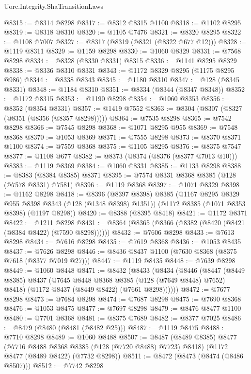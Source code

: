 \begin{lexlean}{Uorc.Integrity.ShaTransitionLaws}
\begin{coremodule}
@8315 := @8314 @8298
@8317 := @8312 @8315 @1100
@8318 := @1102 @8295
@8319 := @8318 @8310
@8320 := @1105 @7476
@8321 := @8320 @8295
@8322 := @1108 @7007
@8327 := @8317 (@8319 (@8321 (@8322 @677 @12)))
@8328 := @1119 @8311
@8329 := @1159 @8298
@8330 := @1060 @8329
@8331 := @7568 @8298
@8334 := @8328 (@8330 @8331) @8315
@8336 := @1141 @8295 @8329
@8338 := @8336 @8310 @8331
@8343 := @1172 @8329 @8295 (@1175 @8295 @986)
@8344 := @8338 @8343
@8345 := @1180 @8310
@8347 := @128 (@8345 @8331)
@8348 := @1184 @8310
@8351 := @8334 (@8344 (@8347 @8348))
@8352 := @1172 @8315
@8353 := @1190 @8298
@8354 := @1060 @8353
@8356 := @8352 (@8354 @8331)
@8357 := @1419 @7552
@8363 := @8304 (@8307 (@8327 (@8351 (@8356 (@8357 @8298)))))
@8364 := @7535 @8298
@8365 := @7542 @8298
@8366 := @7545 @8298
@8368 := @1071 @8295 @955
@8369 := @7548 @8368
@8370 := @1053 @8369
@8371 := @7555 @8298
@8373 := @8370 @8371 @1100
@8374 := @7559 @8368
@8375 := @1105 @8295
@8376 := @8375 @7547
@8377 := @1108 @677
@8382 := @8373 (@8374 (@8376 (@8377 @7013 @10)))
@8383 := @1119 @8369
@8384 := @1060 @8331
@8385 := @1133 @8298
@8388 := @8383 (@8384 @8385) @8371
@8395 := @7574 @8331 @8368 @8385 (@128 (@7578 @8331) @7581)
@8396 := @1119 @8368
@8397 := @1071 @8329
@8398 := @1162 @8298
@8418 := @8396
    (@8397 @8398)
    @8385
    (@1167 @8295 @8329 @955 @8398 @8343 (@128 (@1348 @8398) @1351))
    (@1172 @8385 (@1071 @8353 @8398) (@1197 @8298))
@8420 := @8388 (@8395 @8418)
@8421 := @1172 @8371
@8422 := @1211 @8298
@8431 := @8364 (@8365 (@8366 (@8382 (@8420 (@8421 (@8384 @8422) (@7590 @8298))))))
@8432 := @7606 @8298
@8433 := @7613 @8298
@8434 := @7616 @8298
@8435 := @7619 @8368
@8436 := @1053 @8435
@8437 := @7626 @8298
@8446 := @8436 @8437 @1100 (@7630 @8368 (@8375 @7618 (@8377 @7019 @27)))
@8447 := @1119 @8435
@8448 := @7639 @8298
@8449 := @1060 @8448
@8471 := @8432
    (@8433
      (@8434
        (@8446
          (@8447
            (@8449 @8385)
            @8437
            (@7645 @8448 @8368 @8385 (@128 (@7649 @8448) @7652) @8418)
            (@1172 @8437 (@8449 @8422) (@7661 @8298))))))
@8472 := @7677 @8298
@8473 := @7684 @8298
@8474 := @7687 @8298
@8475 := @7690 @8368
@8476 := @1053 @8475
@8477 := @7697 @8298
@8479 := @8476 @8477 @1100
@8480 := @7701 @8368
@8481 := @8375 @7689
@8482 := @8377 @7025
@8486 := @8479 (@8480 (@8481 (@8482 @25)))
@8487 := @1119 @8475
@8488 := @7710 @8298
@8489 := @1060 @8488
@8507 := @8487
    (@8489 @8385)
    @8477
    (@7716 @8488 @8368 @8385 (@128 (@7720 @8488) @7723) @8418)
    (@1172 @8477 (@8489 @8422) (@7732 @8298))
@8511 := @8472 (@8473 (@8474 (@8486 @8507)))
@8512 := @7742 @8298

\end{coremodule}
\end{lexlean}
